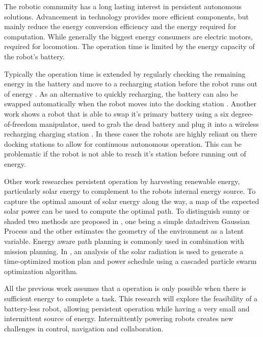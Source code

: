 \documentclass[letterpaper, 10 pt, conference]{ieeeconf}  %
\begin{document}

The robotic community has a long lasting interest in persistent autonomous solutions.
Advancement in technology provides more efficient components, but mainly reduce the energy conversion efficiency and the energy required for computation.
While generally the biggest energy consumers are electric motors, required for locomotion.
The operation time is limited by the energy capacity of the robot's battery.

Typically the operation time is extended by regularly checking the remaining energy in the battery and move to a recharging station before the robot runs out of energy \cite{GRITSBot, Kilobot}.
As an alternative to quickly recharging, the battery can also be swapped automatically when the robot moves into the docking station \cite{AutoBat}.
Another work shows a robot that is able to swap it's primary battery using a six degree-of-freedom manipulator, used to grab the dead battery and plug it into a wireless recharging charging station \cite{BatSwap}.
In these cases the robots are highly reliant on there docking stations to allow for continuous autonomous operation.
This can be problematic if the robot is not able to reach it's station before running out of energy.



Other work researches persistent operation by harvesting renewable energy, particularly solar energy to complement to the robots internal energy source.
To capture the optimal amount of solar energy along the way, a map of the expected solar power can be used to compute the optimal path. To distinguish sunny or shaded two methods are proposed in \cite{SolMap}, one being a simple datadriven Gaussian Process and the other estimates the geometry of the environment as a latent variable.
Energy aware path planning is commonly used in combination with mission planning.
In \cite{PlanUGV}, an analysis of the solar radiation is used to generate a time-optimized motion plan and power schedule using a cascaded particle swarm optimization algorithm.


All the previous work assumes that a operation is only possible when there is sufficient energy to complete a task. 
This research will explore the feasibility of a battery-less robot, allowing persistent operation while having a very small and intermittent source of energy.
Intermittently powering robots creates new challenges in control, navigation and collaboration.
\end{document}
